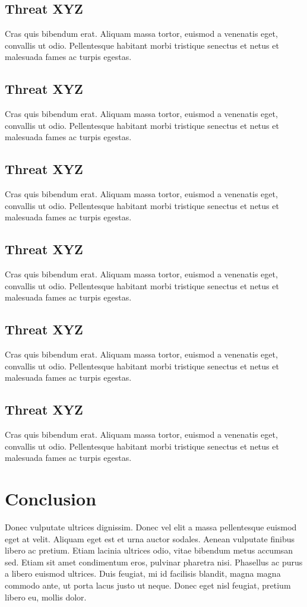 \documentclass[runningheads]{llncs}
\begin{document}
\subsection{Threat XYZ}
Cras quis bibendum erat. Aliquam massa tortor, euismod a venenatis eget,
convallis ut odio. Pellentesque habitant morbi tristique senectus et netus et
malesuada fames ac turpis egestas.
%
\subsection{Threat XYZ}
Cras quis bibendum erat. Aliquam massa tortor, euismod a venenatis eget,
convallis ut odio. Pellentesque habitant morbi tristique senectus et netus et
malesuada fames ac turpis egestas.
%
\subsection{Threat XYZ}
Cras quis bibendum erat. Aliquam massa tortor, euismod a venenatis eget,
convallis ut odio. Pellentesque habitant morbi tristique senectus et netus et
malesuada fames ac turpis egestas.
%
\subsection{Threat XYZ}
Cras quis bibendum erat. Aliquam massa tortor, euismod a venenatis eget,
convallis ut odio. Pellentesque habitant morbi tristique senectus et netus et
malesuada fames ac turpis egestas.
%
\subsection{Threat XYZ}
Cras quis bibendum erat. Aliquam massa tortor, euismod a venenatis eget,
convallis ut odio. Pellentesque habitant morbi tristique senectus et netus et
malesuada fames ac turpis egestas.
%
\subsection{Threat XYZ}
Cras quis bibendum erat. Aliquam massa tortor, euismod a venenatis eget,
convallis ut odio. Pellentesque habitant morbi tristique senectus et netus et
malesuada fames ac turpis egestas.
%
\section{Conclusion}
Donec vulputate ultrices dignissim. Donec vel elit a massa pellentesque euismod
eget at velit. Aliquam eget est et urna auctor sodales. Aenean vulputate finibus
libero ac pretium. Etiam lacinia ultrices odio, vitae bibendum metus accumsan
sed. Etiam sit amet condimentum eros, pulvinar pharetra nisi. Phasellus ac purus
a libero euismod ultrices. Duis feugiat, mi id facilisis blandit, magna magna
commodo ante, ut porta lacus justo ut neque. Donec eget nisl feugiat, pretium
libero eu, mollis dolor.
\end{document}

